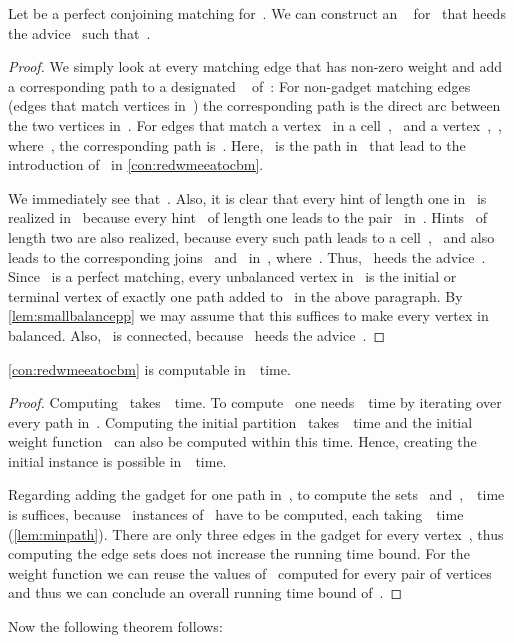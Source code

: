 \begin{lemma}
  \label{lem:redwmeeatocbmbacktransfer}
  Let  be a perfect conjoining matching for~. We can construct an \EE{}~ for~ that heeds the advice~ such that~.
\end{lemma}
\begin{proof}
  We simply look at every matching edge that has non-zero weight and add a corresponding path to a designated \EE{}~ of~: For non-gadget matching edges (edges that match vertices in~) the corresponding path is the direct arc between the two vertices in~. For edges that match a vertex~ in a cell~,~ and a vertex~,~, where~, the corresponding path is~. Here, ~is the path in~ that lead to the introduction of~ in \autoref{con:redwmeeatocbm}.



  We immediately see that~. Also, it is clear that every hint of length one in~ is realized in~ because every hint~ of length one leads to the pair~ in~. Hints~ of length two are also realized, because every such path leads to a cell~,~ and also leads to the corresponding joins~ and~ in~, where~. Thus,~ heeds the advice~. Since~ is a perfect matching, every unbalanced vertex in~ is the initial or terminal vertex of exactly one path added to~ in the above paragraph. By \autoref{lem:smallbalancepp} we may assume that this suffices to make every vertex in~ balanced. Also, ~is connected, because~ heeds the advice~.
\end{proof}
\begin{lemma}
  \label{con:redwmeeatocbmruntime}
  \autoref{con:redwmeeatocbm} is computable in~~time.
\end{lemma}
\begin{proof}
  Computing~ takes~~time. To compute~ one needs~~time by iterating over every path in~. Computing the initial partition~ takes~~time and the initial weight function~ can also be computed within this time. Hence, creating the initial instance is possible in~~time.
 
  Regarding adding the gadget for one path in~, to compute the sets~ and~,~~time is suffices, because~ instances of~ have to be computed, each taking~~time (\autoref{lem:minpath}). There are only three edges in the gadget for every vertex~, thus computing the edge sets does not increase the running time bound. For the weight function we can reuse the values of~ computed for every pair of vertices~ and thus we can conclude an overall running time bound of~.
\end{proof}
Now the following theorem follows:
